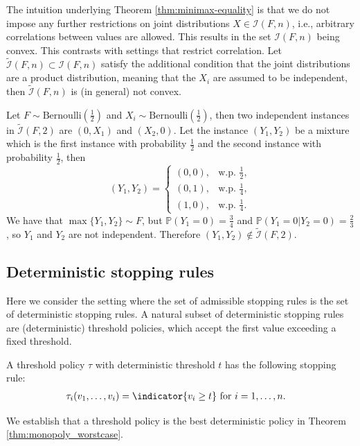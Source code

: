 \documentclass[11pt,a4paper]{article}
\numberwithin{equation}{section}
\begin{document}
The intuition underlying Theorem \ref{thm:minimax-equality} is that we do not impose any further restrictions on joint distributions $X \in \mathcal{I}(F,n)$, i.e., arbitrary correlations between values are allowed. This results in the set $\mathcal{I}(F,n)$ being convex. 
This contrasts with settings that restrict correlation. 
Let $\tilde{\mathcal{I}}(F,n)\subset\mathcal{I}(F,n)$ satisfy the additional condition that the joint distributions are a product distribution, meaning that the $X_i$ are assumed to be independent, then $\tilde{\mathcal{I}}(F,n)$ is (in general) not convex.
\begin{example}
    Let $F\sim\mathrm{Bernoulli}(\frac{1}{2})$ and $X_i\sim\mathrm{Bernoulli}(\frac{1}{2})$, then two independent instances in $\tilde{\mathcal{I}}(F,2)$ are $(0,X_1)$ and $(X_2,0)$.
    Let the instance $(Y_1,Y_2)$ be a mixture which is the first instance with probability $\frac{1}{2}$ and the second instance with probability $\frac{1}{2}$, then
    $$
    (Y_1,Y_2)=
    \begin{cases}
        (0,0),&\text{w.p. }\frac{1}{2},\\
        (0,1),&\text{w.p. }\frac{1}{4},\\
        (1,0),&\text{w.p. }\frac{1}{4}.
    \end{cases}
    $$
    We have that $\max\{Y_1,Y_2\}\sim F$, but $\mathbb{P}(Y_1=0)=\frac{3}{4}$ and $\mathbb{P}(Y_1=0|Y_2=0)=\frac{2}{3}$, so $Y_1$ and $Y_2$ are not independent. Therefore $(Y_1,Y_2)\notin\tilde{\mathcal{I}}(F,2)$. 
\end{example}


\subsection{Deterministic stopping rules}
Here we consider the setting where the set of admissible stopping rules is the set of deterministic stopping rules.
A natural subset of deterministic stopping rules are (deterministic) threshold policies, which accept the first value exceeding a fixed threshold.
\begin{definition}
    \label{def:threshold-policy}
    A threshold policy $\tau$ with deterministic threshold $t$ has the following stopping rule:
    \begin{align*}
        \tau_i(v_1,\dots,v_i)&=\indicator{v_i\ge t}\text{ for }i=1,\dots,n.
    \end{align*}
\end{definition}
We establish that a threshold policy is the best deterministic policy in Theorem \ref{thm:monopoly_worstcase}.
\end{document}

